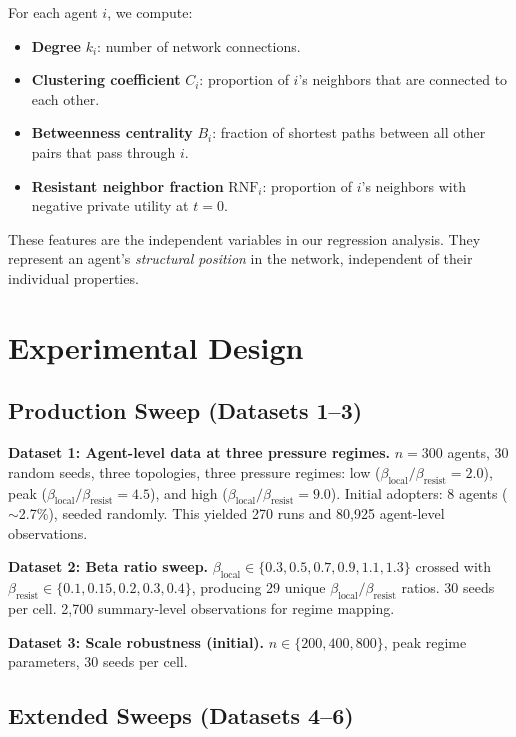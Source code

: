 \documentclass[11pt, a4paper]{article}
\newcommand{\betalocal}{\beta_{\text{local}}}
\newcommand{\betaresist}{\beta_{\text{resist}}}
\newcommand{\RNF}{\text{RNF}}
\begin{document}
For each agent $i$, we compute:

\begin{itemize}
    \item \textbf{Degree} $k_i$: number of network connections.
    \item \textbf{Clustering coefficient} $C_i$: proportion of $i$'s neighbors that are connected to each other.
    \item \textbf{Betweenness centrality} $B_i$: fraction of shortest paths between all other pairs that pass through $i$.
    \item \textbf{Resistant neighbor fraction} $\RNF_i$: proportion of $i$'s neighbors with negative private utility at $t = 0$.
\end{itemize}

These features are the independent variables in our regression analysis. They represent an agent's \textit{structural position} in the network, independent of their individual properties.

\section{Experimental Design}
\label{sec:experiments}

\subsection{Production Sweep (Datasets 1--3)}

\textbf{Dataset 1: Agent-level data at three pressure regimes.} $n = 300$ agents, 30 random seeds, three topologies, three pressure regimes: low ($\betalocal/\betaresist = 2.0$), peak ($\betalocal/\betaresist = 4.5$), and high ($\betalocal/\betaresist = 9.0$). Initial adopters: 8 agents ($\sim$2.7\%), seeded randomly. This yielded 270 runs and 80{,}925 agent-level observations.

\textbf{Dataset 2: Beta ratio sweep.} $\betalocal \in \{0.3, 0.5, 0.7, 0.9, 1.1, 1.3\}$ crossed with $\betaresist \in \{0.1, 0.15, 0.2, 0.3, 0.4\}$, producing 29 unique $\betalocal/\betaresist$ ratios. 30 seeds per cell. 2{,}700 summary-level observations for regime mapping.

\textbf{Dataset 3: Scale robustness (initial).} $n \in \{200, 400, 800\}$, peak regime parameters, 30 seeds per cell.

\subsection{Extended Sweeps (Datasets 4--6)}
\end{document}

